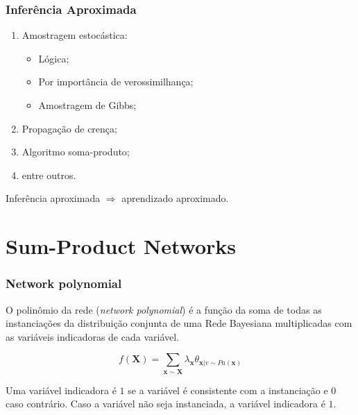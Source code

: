 \documentclass[10pt]{beamer}
\theoremstyle{plain}
\newcommand{\set}[1]{\mathbf{#1}}
\renewcommand{\implies}{\Rightarrow}
\begin{document}
\begin{frame}
  \frametitle{Inferência Aproximada}
  \begin{enumerate}
    \item Amostragem estocástica:
    \begin{itemize}
      \item Lógica;
      \item Por importância de verossimilhança;
      \item Amostragem de Gibbs;
    \end{itemize}
    \item Propagação de crença;
    \item Algoritmo soma-produto;
    \item entre outros.
  \end{enumerate}

  Inferência aproximada $\implies$ aprendizado aproximado.
\end{frame}


\section[SPNs]{Sum-Product Networks}

\begin{frame}
  \frametitle{Network polynomial}

  \begin{definition}
  O polinômio da rede (\emph{network polynomial}) é a função da soma de todas as instanciações da
  distribuição conjunta de uma Rede Bayesiana multiplicadas com as variáveis indicadoras de cada
  variável.

  \begin{equation*}
    f(\set{X})=\sum_{\set{x}\sim\set{X}} \lambda_{\set{x}}\theta_{\set{x}|v\sim Pa(\set{x})}
  \end{equation*}

  Uma variável indicadora é $1$ se a variável é consistente com a instanciação e 0 caso contrário.
  Caso a variável não seja instanciada, a variável indicadora é $1$.
  \end{definition}
\end{frame}
\end{document}
